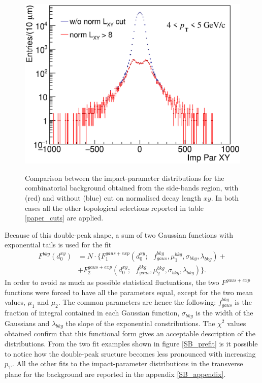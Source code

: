 \documentclass[b5paper,10pt,twoside,oldstyle,classica]{toptesi}
\newcommand{\pt}{p_\text{T}}
\begin{document}
\begin{figure}[tb]
\begin{center}
{\includegraphics[scale = 0.38]{ImpParDistr.eps}}
\caption{Comparison between the impact-parameter distributions for the combinatorial background obtained from the side-bands region, with (red) and without (blue) cut on normalised decay length $xy$. In both cases all the other topological selections reported in table \ref{paper_cuts} are applied.}
\label{double-peak}
\end{center}
\end{figure}
Because of this double-peak shape, a sum of two Gaussian functions with exponential tails is used for the fit
\begin{equation}
\begin{split}
F^{bkg}(d_0^{xy}) &= N \cdot \bigg\{F^{gaus+exp}_1(d_0^{xy};\text{ }f_{gaus}^{bkg},\mu_1^{bkg},\sigma_{bkg},\lambda_{bkg})+\\
&+F^{gaus+exp}_2(d_0^{xy};\text{ }f_{gaus}^{bkg},\mu_2^{bkg},\sigma_{bkg},\lambda_{bkg})\bigg\}.
\end{split}
\label{bkg_func}
\end{equation}
In order to avoid as much as possible statistical fluctuations, the two $F^{gaus+exp}$ functions were forced to have all the parameters equal, except for the two mean values, $\mu_1$ and $\mu_2$. The common parameters are hence the following: $f_{gaus}^{bkg}$ is the fraction of integral contained in each Gaussian function, $\sigma_{bkg}$ is the width of the Gaussians and $\lambda_{bkg}$ the slope of the exponential constributions. The $\chi^2$ values obtained confirm that this functional form gives an acceptable description of the distributions. From the two fit examples shown in figure \ref{SB_prefit} is it possible to notice how the double-peak sructure becomes less pronounced with increasing $\pt$. All the other fits to the impact-parameter distributions in the transverse plane for the background are reported in the appendix \ref{SB_appendix}.
\end{document}
